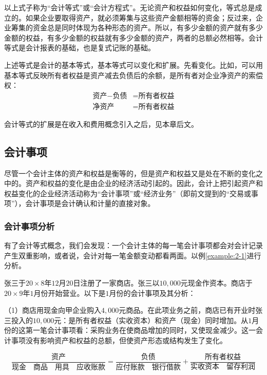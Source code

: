 		以上式子称为“会计等式”或“会计方程式”。无论资产和权益如何变化，等式总是成立的。如果企业要取得资产，就必须筹集与这些资产金额相等的资金；反过来，企业筹集的资金总是同时体现为各种形态的资产。所以，有多少金额的资产就有多少金额的权益，有多少金额的权益就有多少金额的资产，两者的总额必然相等。会计等式是会计报表的基础，也是复式记账的基础。
		
		上述等式是会计的基本等式，基本等式可以变化和扩展。先看变化。比如，可以用基本等式反映所有者权益是资产减去负债后的余额，是所有者对企业净资产的索偿权：%
		\begin{align*}
			\text{资产} - \text{负债} &= \text{所有者权益} \\ 
			\text{净资产} &= \text{所有者权益}
		\end{align*}
		
		会计等式的扩展是在收入和费用概念引入之后，见本章后文。

		\subsection{会计事项}

		尽管一个会计主体的资产和权益是衡等的，但是资产和权益又是处在不断的变化之中的。资产和权益的变化是由企业的经济活动引起的。因此，会计上把引起资产和权益变化的企业经济活动称为“会计事项”或“经济业务”（即前文提到的“交易或事项”），会计事项是会计确认和计量的直接对象。
		
		\subsubsection{会计事项分析}
		
		有了会计等式概念，我们会发现：一个会计主体的每一笔会计事项都会对会计记录产生双重影响，或者说，会计对每一笔金额变动都看两面。以例\ref{example:2-1}进行分析。

		\example\label{example:2-1} 张三于$20 \times 8$年$12$月$20$日注册了一家商店。张三以$10,000$元现金作资本。商店于$20 \times 9$年$1$月份开始营业。以下是$1$月份的会计事项及其分析：

		（1）商店用现金向甲企业购入$4,000$元商品。在此项业务之前，商店已有开业时张三投入的$10,000$元：是所有者权益（实收资本）和资产（现金）同时增加。从$1$月份的这第一笔会计事项看：采购业务在使商品增加的同时，又使现金减少。这一会计事项没有影响资产和权益的总额，但使资产形态或结构发生了变化。

		$$\frac{\text{资产}}{\text{现金} \quad \text{商品} \quad \text{用具} \quad \text{应收账款}} = \frac{\text{负债}}{\text{应付账款} \quad \text{银行借款}} + \frac{\text{所有者权益}}{\text{实收资本} \quad \text{留存利润}}$$

